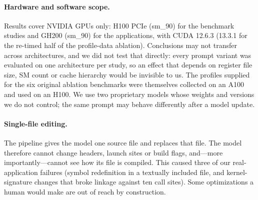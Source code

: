 \paragraph{Hardware and software scope.}
Results cover NVIDIA GPUs only: H100 PCIe (sm\_90) for the benchmark studies and GH200 (sm\_90) for
the applications, with CUDA 12.6.3 (13.3.1 for the re-timed half of the profile-data ablation).
Conclusions may not transfer across architectures, and we did not test that
directly: every prompt variant was evaluated on one architecture per study, so an effect that depends
on register file size, SM count or cache hierarchy would be invisible to us. The profiles supplied for
the six original ablation benchmarks were themselves collected on an A100 and used on an H100. We use two proprietary models whose weights and versions we do not control; the
same prompt may behave differently after a model update.

\paragraph{Single-file editing.}
The pipeline gives the model one source file and replaces that file. The model therefore cannot change
headers, launch sites or build flags, and---more importantly---cannot see how its file is compiled.
This caused three of our real-application failures (symbol redefinition in a textually included file,
and kernel-signature changes that broke linkage against ten call sites). Some optimizations a human
would make are out of reach by construction.
